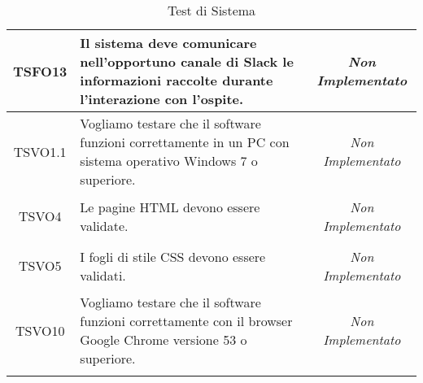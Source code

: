 \begin{longtable}{|c|>{}m{8cm}|c|}
\hypertarget{TSFO13}{TSFO13} & Il sistema deve comunicare nell'opportuno canale di Slack le informazioni raccolte durante l'interazione con l'ospite. & \textit{Non Implementato}\\ \hline
\hypertarget{TSVO1.1}{TSVO1.1} & Vogliamo testare che il software funzioni correttamente in un PC con sistema operativo Windows 7 o superiore.
 & \textit{Non Implementato}\\ \hline
\hypertarget{TSVO4}{TSVO4} & Le pagine HTML devono essere validate. & \textit{Non Implementato}\\ \hline
\hypertarget{TSVO5}{TSVO5} & I fogli di stile CSS devono essere validati. & \textit{Non Implementato}\\ \hline
\hypertarget{TSVO10}{TSVO10} & Vogliamo testare che il software funzioni correttamente con il browser Google Chrome versione 53 o superiore. & \textit{Non Implementato}\\ \hline
\caption[Test di Sistema]{Test di Sistema}
\label{tabella:test1}
\end{longtable}
\clearpage

